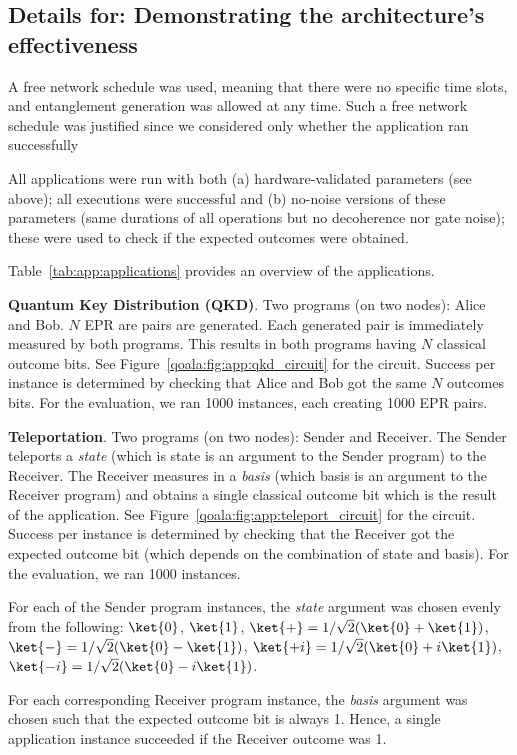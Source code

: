 \subsection{Details for: Demonstrating the architecture's effectiveness}
\label{qoala:sec:app:details_6_1}
A free network schedule was used, meaning that there were no specific time slots, and entanglement generation was allowed at any time.
Such a free network schedule was justified since we considered only whether the application ran successfully

All applications were run with both (a) hardware-validated parameters (see above); all executions were successful and (b) no-noise versions of these parameters (same durations of all operations but no decoherence nor gate noise); these were used to check if the expected outcomes were obtained.

Table~\ref{tab:app:applications} provides an overview of the applications.

\textbf{Quantum Key Distribution (QKD)}. 
Two programs (on two nodes): Alice and Bob. $N$ EPR are pairs are generated. Each generated pair is immediately measured by both programs.
This results in both programs having $N$ classical outcome bits.
See Figure~\ref{qoala:fig:app:qkd_circuit} for the circuit.
Success per instance is determined by checking that Alice and Bob got the same $N$ outcomes bits.
For the evaluation, we ran 1000 instances, each creating 1000 EPR pairs.

\textbf{Teleportation}.
Two programs (on two nodes): Sender and Receiver. The Sender teleports a \textit{state} (which is state is an argument to the Sender program) to the Receiver.
The Receiver measures in a \textit{basis} (which basis is an argument to the Receiver program) and obtains a single classical outcome bit which is the result of the application.
See Figure~\ref{qoala:fig:app:teleport_circuit} for the circuit.
Success per instance is determined by checking that the Receiver got the expected outcome bit (which depends on the combination of state and basis).
For the evaluation, we ran 1000 instances.

For each of the Sender program instances, the \textit{state} argument was chosen evenly from the following:
$\ket{0}$,
$\ket{1}$,
$\ket{+} = 1/\sqrt{2} (\ket{0} + \ket{1})$,
$\ket{-} = 1/\sqrt{2} (\ket{0} - \ket{1})$,
$\ket{+i} = 1/\sqrt{2} (\ket{0} + i \ket{1})$,
$\ket{-i} = 1/\sqrt{2} (\ket{0} - i \ket{1})$.

For each corresponding Receiver program instance, the \textit{basis} argument was chosen such that the expected outcome bit is always 1.
Hence, a single application instance succeeded if the Receiver outcome was 1.

